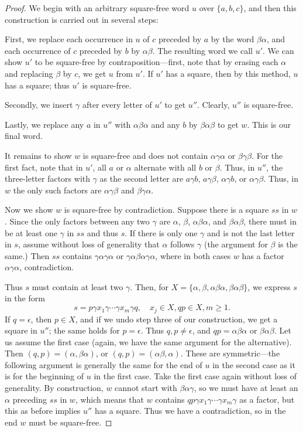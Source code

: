 \documentclass[letterpaper,12pt]{article}
\begin{document}
\begin{proof}

We begin with an arbitrary square-free word $u$ over $\{a, b, c\}$, and then this construction is carried out in several steps:

First, we replace each occurrence in $u$ of $c$ preceded by $a$ by the word $\beta \alpha$, and each occurrence of $c$ preceded by $b$ by $\alpha \beta$. The resulting word we call $u'$. We can show $u'$ to be square-free by contraposition---first, note that by erasing each $\alpha$ and replacing $\beta$ by $c$, we get $u$ from $u'$. If $u'$ has a square, then by this method, $u$ has a square; thus $u'$ is square-free.

Secondly, we insert $\gamma$ after every letter of $u'$ to get $u''$. Clearly, $u''$ is square-free.

Lastly, we replace any $a$ in $u''$ with $\alpha \beta \alpha$ and any $b$ by $\beta \alpha \beta$ to get $w$. This is our final word.

It remains to show $w$ is square-free and does not contain $\alpha \gamma \alpha$ or $\beta \gamma \beta$. For the first fact, note that in $u'$, all $a$ or $\alpha$ alternate with all $b$ or $\beta$. Thus, in $u''$, the three-letter factors with $\gamma$ as the second letter are $a\gamma b$, $a\gamma\beta$, $\alpha\gamma b$, or $\alpha\gamma\beta$. Thus, in $w$ the only such factors are $\alpha\gamma\beta$ and $\beta\gamma\alpha$.

Now we show $w$ is square-free by contradiction. Suppose there is a square $ss$ in $w$. Since the only factors between any two $\gamma$ are $\alpha$, $\beta$, $\alpha\beta\alpha$, and $\beta\alpha\beta$, there must in be at least one $\gamma$ in $ss$ and thus $s$. If there is only one $\gamma$ and is not the last letter in $s$, assume without loss of generality that $\alpha$ follows $\gamma$ (the argument for $\beta$ is the same.) Then $ss$ contains $\gamma\alpha\gamma\alpha$ or $\gamma\alpha\beta\alpha\gamma\alpha$, where in both cases $w$ has a factor $\alpha\gamma\alpha$, contradiction.

Thus $s$ must contain at least two $\gamma$. Then, for $X = \{\alpha, \beta, \alpha\beta\alpha, \beta\alpha\beta\}$, we express $s$ in the form
\[
	s = p\gamma x_1 \gamma \cdots \gamma x_m \gamma q, \quad x_j \in X, qp \in X, m \geq 1.
\]
If $q = \epsilon$, then $p \in X$, and if we undo step three of our construction, we get a square in $u''$; the same holds for $p = \epsilon$. Thus $q, p \neq \epsilon$, and $qp = \alpha\beta\alpha$ or $\beta\alpha\beta$. Let us assume the first case (again, we have the same argument for the alternative). Then $(q,p) = (\alpha, \beta\alpha)$, or $(q,p) = (\alpha\beta, \alpha)$. These are symmetric---the following argument is generally the same for the end of $u$ in the second case as it is for the beginning of $u$ in the first case. Take the first case again without loss of generality. By construction, $w$ cannot start with $\beta\alpha\gamma$, so we must have at least an $\alpha$ preceding $ss$ in $w$, which means that $w$ contains $qp\gamma x_1 \gamma \cdots \gamma x_m \gamma$ as a factor, but this as before implies $u''$ has a square. Thus we have a contradiction, so in the end $w$ must be square-free.


\end{proof}
\end{document}
